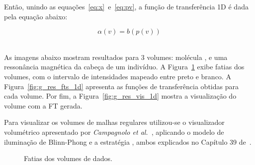 	Então, unindo as equações~\eqref{eq:x}~e~\eqref{eq:pv}, a função de transferência 1D é dada pela equação abaixo:
	
\begin{equation} \label{eq:alpha}
	\alpha(v) = b(p(v))
\end{equation} \

	As imagens abaixo mostram resultados para 3 volumes: molécula ,  e uma ressonância magnética da cabeça de um indivíduo. A Figura~\ref{fig:g_res_slices_1d} exibe fatias dos volumes, com o intervalo de intensidades mapeado entre preto e branco. A Figura~\ref{fig:g_res_fts_1d} apresenta as funções de transferência obtidas para cada volume. Por fim, a Figura~\ref{fig:g_res_vis_1d} mostra a visualização do volume com a FT gerada.
	
	Para visualizar os volumes de malhas regulares utilizou-se o visualizador volumétrico apresentado por \textit{Campagnolo et al.}~\cite{lqc}, aplicando o modelo de iluminação de Blinn-Phong e a estratégia , ambos explicados no Capítulo 39 de~\cite{gems}.
	
\begin{figure}[h]
	\centering
	\caption{Fatias dos volumes de dados.}
	\label{fig:g_res_slices_1d}
\end{figure}

